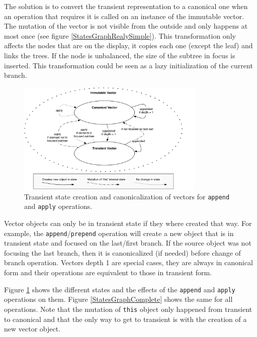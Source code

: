 The solution is to convert the transient representation to a canonical one when an operation that requires it is called on an instance of the immutable vector. The mutation of the vector is not visible from the outside and only happens at most once (see figure \ref{StatesGraphRealySimple}). This transformation only affects the nodes that are on the display, it copies each one (except the leaf) and links the trees. If the node is unbalanced, the size of the subtree in focus is inserted. This transformation could be seen as a lazy initialization of the current branch.

\begin{figure}[h!]
  \centering
  \includegraphics[width=0.8\textwidth]{Figures/StatesGraphSimple}
  \caption{Transient state creation and canonicalization of vectors for \texttt{append} and \texttt{apply} operations.}
  \label{StatesGraphSimple}
\end{figure}

Vector objects can only be in transient state if they where created that way. For example, the \texttt{append}/\texttt{prepend} operation will create a new object that is in transient state and focused on the last/first branch. If the source object was not focusing the last branch, then it is canonicalized (if needed) before change of branch operation. Vectors depth 1 are special cases, they are always in canonical form and their operations are equivalent to those in transient form.

Figure \ref{StatesGraphSimple} shows the different states and the effects of the \texttt{append} and \texttt{apply} operations on them. Figure \ref{StatesGraphComplete} shows the same for all operations. Note that the mutation of \texttt{this} object only happened from transient to canonical and that the only way to get to transient is with the creation of a new vector object.

